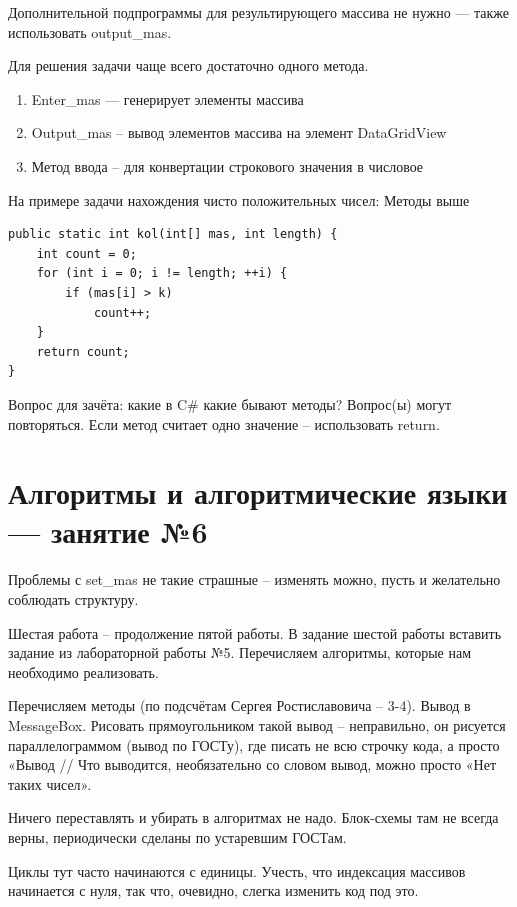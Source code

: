 \documentclass{article}
\begin{document}
Дополнительной подпрограммы для результирующего массива не нужно — также использовать output\_mas.

Для решения задачи чаще всего достаточно одного метода.

\begin{enumerate}
    \item Enter\_mas — генерирует элементы массива
    \item Output\_mas – вывод элементов массива на элемент DataGridView
    \item Метод ввода – для конвертации строкового значения в числовое
\end{enumerate}

На примере задачи нахождения чисто положительных чисел:
Методы выше

\begin{verbatim}
public static int kol(int[] mas, int length) {
    int count = 0;
    for (int i = 0; i != length; ++i) {
        if (mas[i] > k)
            count++;
    }
    return count;
}
\end{verbatim}

Вопрос для зачёта: какие в C\# какие бывают методы? Вопрос(ы) могут повторяться. Если метод считает одно значение – использовать return.

\pagebreak
\section{Алгоритмы и алгоритмические языки — занятие №6}

Проблемы с set\_mas не такие страшные – изменять можно, пусть и желательно соблюдать структуру.

\hfill

Шестая работа – продолжение пятой работы.
В задание шестой работы вставить задание из лабораторной работы №5. Перечисляем алгоритмы, которые нам необходимо реализовать.

Перечисляем методы (по подсчётам Сергея Ростиславовича – 3-4). Вывод в MessageBox. Рисовать прямоугольником такой вывод – неправильно, он рисуется параллелограммом (вывод по ГОСТу), где писать не всю строчку кода, а просто «Вывод // Что выводится, необязательно со словом вывод, можно просто «Нет таких чисел».

\hfill

Ничего переставлять и убирать в алгоритмах не надо. Блок-схемы там не всегда верны, периодически сделаны по устаревшим ГОСТам.

Циклы тут часто начинаются с единицы. Учесть, что индексация массивов начинается с нуля, так что, очевидно, слегка изменить код под это.
\end{document}
